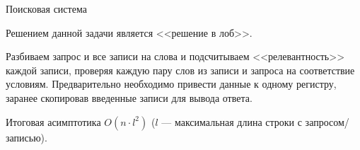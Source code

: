 \begin{tutorial}{Поисковая система}

Решением данной задачи является <<решение в лоб>>. 

Разбиваем запрос и все записи на слова и подсчитываем <<релевантность>> каждой записи, проверяя каждую пару слов из записи и запроса на соответствие условиям. Предварительно необходимо привести данные к одному регистру, заранее скопировав введенные записи для вывода ответа. 

Итоговая асимптотика $O(n \cdot l^2)$ ($l$ --- максимальная длина строки с запросом/записью).

\end{tutorial}
